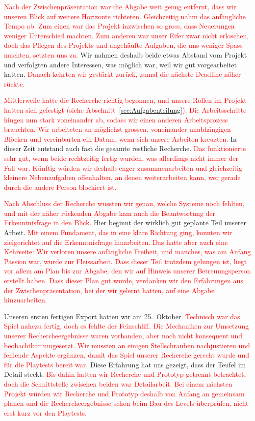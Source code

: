 \documentclass[../Main.tex]{subfiles}
\begin{document}
\textcolor{red}{Nach der Zwischenpräsentation war die Abgabe weit genug entfernt, dass wir unseren Blick auf weitere Horizonte richteten. Gleichzeitig nahm das anfängliche Tempo ab. Zum einen war das Projekt inzwischen so gross, dass Neuerungen weniger Unterschied machten. Zum anderen war unser Eifer zwar nicht erloschen, doch das Pflegen des Projekts und angehäufte Aufgaben, die uns weniger Spass machten, setzten uns zu.} Wir nahmen deshalb beide etwas Abstand vom Projekt und verfolgten andere Interessen, was möglich war, weil wir gut vorgearbeitet hatten. \textcolor{red}{Danach kehrten wir gestärkt zurück, zumal die nächste Deadline näher rückte.}

\textcolor{red}{Mittlerweile hatte die Recherche richtig begonnen, und unsere Rollen im Projekt hatten sich gefestigt (siehe Abschnitt~\ref{sec:Aufgabenteilung}). Die Arbeitsschritte hingen nun stark voneinander ab, sodass wir einen anderen Arbeitsprozess brauchten. Wir arbeiteten an möglichst grossen, voneinander unabhängigen Blöcken und vereinbarten ein Datum, wenn sich unsere Arbeiten kreuzten.} In dieser Zeit entstand auch fast die gesamte restliche Recherche. \textcolor{red}{Das funktionierte sehr gut, wenn beide rechtzeitig fertig wurden, was allerdings nicht immer der Fall war. Künftig würden wir deshalb enger zusammenarbeiten und gleichzeitig kleinere Nebenaufgaben offenhalten, an denen weiterarbeiten kann, wer gerade durch die andere Person blockiert ist.}

\textcolor{red}{Nach Abschluss der Recherche wussten wir genau, welche Systeme noch fehlten, und mit der näher rückenden Abgabe kam auch die Beantwortung der Erkenntnisfrage in den Blick.} Hier beginnt der wirklich gut geplante Teil unserer Arbeit. \textcolor{red}{Mit einem Fundament, das in eine klare Richtung ging, konnten wir zielgerichtet auf die Erkenntnisfrage hinarbeiten. Das hatte aber auch eine Kehrseite: Wir verloren unsere anfängliche Freiheit, und manches, was am Anfang Passion war, wurde zur Fleissarbeit. Dass dieser Teil trotzdem gelungen ist, liegt vor allem am Plan bis zur Abgabe, den wir auf Hinweis unserer Betreuungsperson erstellt haben. Dass dieser Plan gut wurde, verdanken wir den Erfahrungen aus der Zwischenpräsentation, bei der wir gelernt hatten, auf eine Abgabe hinzuarbeiten.}

Unseren ersten fertigen Export hatten wir am 25.~Oktober. \textcolor{red}{Technisch war das Spiel nahezu fertig, doch es fehlte der Feinschliff. Die Mechaniken zur Umsetzung unserer Rechercheergebnisse waren vorhanden, aber noch nicht konsequent und beobachtbar umgesetzt. Wir mussten an einigen Stellschrauben nachjustieren und fehlende Aspekte ergänzen, damit das Spiel unserer Recherche gerecht wurde und für die Playtests bereit war.} Diese Erfahrung hat uns gezeigt, dass der Teufel im Detail steckt. \textcolor{red}{Bis dahin hatten wir Recherche und Prototyp getrennt betrachtet, doch die Schnittstelle zwischen beiden war Detailarbeit. Bei einem nächsten Projekt würden wir Recherche und Prototyp deshalb von Anfang an gemeinsam planen und die Rechercheergebnisse schon beim Bau des Levels überprüfen, nicht erst kurz vor den Playtests.}
\end{document}
